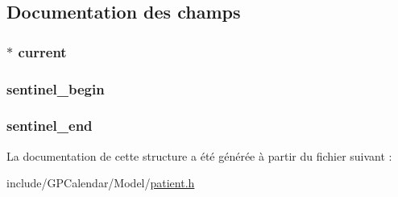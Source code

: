 \subsection{Documentation des champs}
\hypertarget{struct_list_patient_ae1c66e6952e3fd81efd6fe0f72a51826}{
\subsubsection[{current}]{$\ast$ current}}\label{struct_list_patient_ae1c66e6952e3fd81efd6fe0f72a51826}
\hypertarget{struct_list_patient_acacbc6137b28bb2b48b0a2cfe4305024}{
\subsubsection[{sentinel\-\_\-begin}]{ sentinel\-\_\-begin}}\label{struct_list_patient_acacbc6137b28bb2b48b0a2cfe4305024}
\hypertarget{struct_list_patient_ad2cb1194a61ed31c401c99218ff6dbb7}{
\subsubsection[{sentinel\-\_\-end}]{ sentinel\-\_\-end}}\label{struct_list_patient_ad2cb1194a61ed31c401c99218ff6dbb7}


La documentation de cette structure a été générée à partir du fichier suivant \-:\begin{DoxyCompactItemize}
\item 
include/\-G\-P\-Calendar/\-Model/\hyperlink{patient_8h}{patient.\-h}\end{DoxyCompactItemize}
